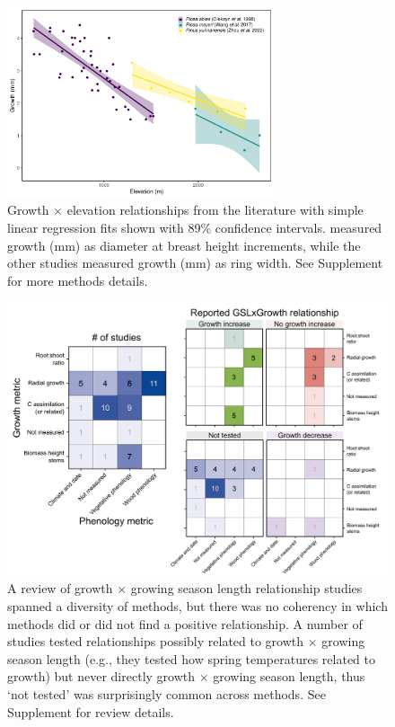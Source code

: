 \documentclass[11pt]{article}
\begin{document}
\begin{figure}[h!]
\includegraphics[width=0.7\textwidth]{..//analyses/growthxelevationetc/figures/growthbyelevation_plot.pdf} %
\caption{Growth $\times$ elevation relationships from the literature with simple linear regression fits shown with 89\% confidence intervals. \citet{oleksyn1998growth} measured growth (mm) as diameter at breast height increments, while the other studies \citep{wang2017climatic,zhou2022altitudinal} measured growth (mm) as ring width. See Supplement for more methods details.} %
\label{fig:gxelev}
\end{figure}

\clearpage
\begin{figure}[h!]
\includegraphics[width=1\textwidth]{..//figures/_figuresFromRuben/heatmap.png} %
\caption{A review of growth $\times$ growing season length relationship studies spanned a diversity of methods, but there was no coherency in which methods did or did not find a positive relationship. A number of studies tested relationships possibly related to growth $\times$ growing season length (e.g., they tested how spring temperatures related to growth) but never directly growth $\times$ growing season length, thus `not tested' was surprisingly common across methods. See Supplement for review details.}
\label{fig:heatmaps}
\end{figure}
\end{document}
